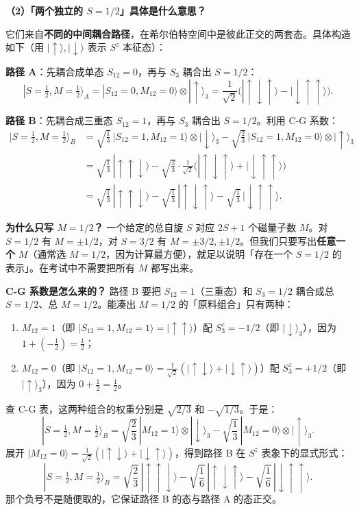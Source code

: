 \textbf{（2）「两个独立的 $S=1/2$」具体是什么意思？}

它们来自\textbf{不同的中间耦合路径}，在希尔伯特空间中是彼此正交的两套态。具体构造如下（用 $|\uparrow\rangle, |\downarrow\rangle$ 表示 $S^z$ 本征态）：

\textbf{路径 A}：先耦合成单态 $S_{12}=0$，再与 $S_3$ 耦合出 $S=1/2$：
\[
|S=\tfrac{1}{2}, M=\tfrac{1}{2}\rangle_A = |S_{12}=0, M_{12}=0\rangle \otimes |\uparrow\rangle_3 = \frac{1}{\sqrt{2}}\bigl(|\uparrow\downarrow\uparrow\rangle - |\downarrow\uparrow\uparrow\rangle\bigr).
\]

\textbf{路径 B}：先耦合成三重态 $S_{12}=1$，再与 $S_3$ 耦合出 $S=1/2$。利用 C-G 系数：
\begin{align*}
|S=\tfrac{1}{2}, M=\tfrac{1}{2}\rangle_B
&= \sqrt{\frac{1}{3}}\,|S_{12}=1, M_{12}=1\rangle \otimes |\downarrow\rangle_3 - \sqrt{\frac{2}{3}}\,|S_{12}=1, M_{12}=0\rangle \otimes |\uparrow\rangle_3 \\
&= \sqrt{\frac{1}{3}}\,|\uparrow\uparrow\downarrow\rangle - \sqrt{\frac{2}{3}} \cdot \frac{1}{\sqrt{2}}\bigl(|\uparrow\downarrow\uparrow\rangle + |\downarrow\uparrow\uparrow\rangle\bigr) \\
&= \sqrt{\frac{1}{3}}\,|\uparrow\uparrow\downarrow\rangle - \sqrt{\frac{1}{3}}\,|\uparrow\downarrow\uparrow\rangle - \sqrt{\frac{1}{3}}\,|\downarrow\uparrow\uparrow\rangle.
\end{align*}

\textbf{为什么只写 $M=1/2$？} 一个给定的总自旋 $S$ 对应 $2S+1$ 个磁量子数 $M$。对 $S=1/2$ 有 $M=\pm 1/2$，对 $S=3/2$ 有 $M=\pm 3/2, \pm 1/2$。但我们只要写出\textbf{任意一个} $M$（通常选 $M=1/2$，因为计算最方便），就足以说明「存在一个 $S=1/2$ 的表示」。在考试中不需要把所有 $M$ 都写出来。

\textbf{C-G 系数是怎么来的？} 路径 B 要把 $S_{12}=1$（三重态）和 $S_3=1/2$ 耦合成总 $S=1/2$、总 $M=1/2$。能凑出 $M=1/2$ 的「原料组合」只有两种：
\begin{enumerate}[nosep]
    \item $M_{12}=1$（即 $|S_{12}=1, M_{12}=1\rangle = |\uparrow\uparrow\rangle$）配 $S_3^z=-1/2$（即 $|\downarrow\rangle_3$），因为 $1 + (-\tfrac{1}{2}) = \tfrac{1}{2}$；
    \item $M_{12}=0$（即 $|S_{12}=1, M_{12}=0\rangle = \frac{1}{\sqrt{2}}(|\uparrow\downarrow\rangle + |\downarrow\uparrow\rangle)$）配 $S_3^z=+1/2$（即 $|\uparrow\rangle_3$），因为 $0 + \tfrac{1}{2} = \tfrac{1}{2}$。
\end{enumerate}

查 C-G 表，这两种组合的权重分别是 $\sqrt{2/3}$ 和 $-\sqrt{1/3}$。于是：
\[
|S=\tfrac{1}{2}, M=\tfrac{1}{2}\rangle_B = \sqrt{\frac{2}{3}}\,|M_{12}=1\rangle \otimes |\downarrow\rangle_3 - \sqrt{\frac{1}{3}}\,|M_{12}=0\rangle \otimes |\uparrow\rangle_3.
\]
展开 $|M_{12}=0\rangle = \frac{1}{\sqrt{2}}(|\uparrow\downarrow\rangle + |\downarrow\uparrow\rangle)$，得到路径 B 在 $S^z$ 表象下的显式形式：
\[
|S=\tfrac{1}{2}, M=\tfrac{1}{2}\rangle_B = \sqrt{\frac{2}{3}}\,|\uparrow\uparrow\downarrow\rangle - \sqrt{\frac{1}{6}}\,|\uparrow\downarrow\uparrow\rangle - \sqrt{\frac{1}{6}}\,|\downarrow\uparrow\uparrow\rangle.
\]
那个负号不是随便取的，它保证路径 B 的态与路径 A 的态正交。

